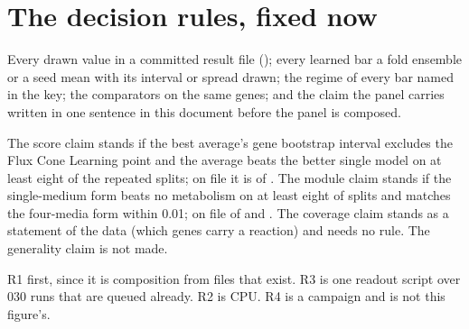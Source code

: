 
\clearpage
\section{The decision rules, fixed now}
\label{sec:state}

 Every drawn value in a committed result
file (); every learned bar a fold ensemble or a seed mean with its interval
or spread drawn; the regime of every bar named in the key; the comparators on the same
genes; and the claim the panel carries written in one sentence in this document before
the panel is composed.

 The score claim stands if the best average's gene
bootstrap interval excludes the Flux Cone Learning point and the average beats the
better single model on at least eight of the \gnResplits{} repeated splits; on file it is
\gresplitDiffaverageMinusthebettersinglemodelUp{} of
\gresplitDiffaverageMinusthebettersinglemodelOf{}. The module claim stands if the
single-medium form beats no metabolism on at least eight of \gnResplits{} splits and
matches the four-media form within 0.01; on file \ggainOneMediumOverNoneUp{} of
\ggainOneMediumOverNoneOf{} and \goneMinusFour{}. The coverage claim stands as a
statement of the data (which genes carry a reaction) and needs no rule. The generality
claim is not made.

 R1 first, since it is composition from files that exist. R3 is one
readout script over 030 runs that are queued already. R2 is CPU. R4 is a campaign and
is not this figure's.
